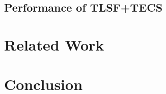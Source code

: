 \documentclass[JIP]{ipsj_v2/UTF8/ipsj}
\begin{document}
\subsection{Performance of TLSF+TECS}


\section{Related Work}
\label{sec:Related Work}


\section{Conclusion}
\label{sec:Conclusion}


\begin{acknowledgment}

\end{acknowledgment}





\end{document}
